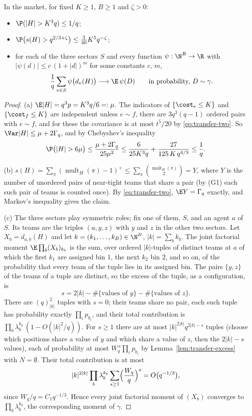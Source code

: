 \begin{proposition}[Typicality]\label{prop:transfer-typical}
In the market, for fixed $K\ge1$, $B\ge1$ and $\zeta>0$:
\begin{itemize}
\item[(a)] $\P(|H|>K^3q)\le1/q$;
\item[(b)] $\P\bigl(s(H)>q^{2/3+\zeta}\bigr)\le\tfrac{3}{40}K^5q^{-\zeta}$;
\item[(c)] for each of the three sectors $S$ and every function $\psi:\N^B\to\R$ with
$|\psi(d)|\le c\,(1+|d|)^m$ for some constants $c$, $m$,
\[
\frac1q\sum_{v\in S}\psi\bigl(d_v(H)\bigr)\longrightarrow\E\,\psi(D)\qquad\text{in probability, }D\sim\gamma .
\]
\end{itemize}
\end{proposition}

\begin{proof}
(a) $\E|H|=q^3p=K^3q/6=:\mu$. The indicators of $\{\cost_e\le K\}$ and $\{\cost_f\le K\}$ are
independent unless $e\sim f$, there are $3q^3(q-1)$ ordered pairs with $e\sim f$, and for these
the covariance is at most $t^5/20$ by \eqref{eq:transfer-two}. So
$\Var|H|\le\mu+2\Gamma_q$, and by Chebyshev's inequality
\[
\P\bigl(|H|>6\mu\bigr)\le\frac{\mu+2\Gamma_q}{25\mu^2}
\le\frac{6}{25K^3q}+\frac{27}{125\,K\,q^{4/3}}\le\frac1q .
\]

(b) $s(H)=\sum_\pi(\operatorname{mult}_H(\pi)-1)^+\le\sum_\pi\binom{\operatorname{mult}_H(\pi)}{2}=Y$,
where $Y$ is the number of unordered pairs of near-tight teams that share a pair (by (G1) each
such pair of teams is counted once). By \eqref{eq:transfer-two}, $\E Y=\Gamma_q$ exactly, and
Markov's inequality gives the claim.

(c) The three sectors play symmetric roles; fix one of them, $S$, and an agent $a$ of $S$.
Its teams are the triples $(a,y,z)$ with $y$ and $z$ in the other two sectors. Let $X_b=d_{a,b}(H)$ and let
$k=(k_1,\dots,k_B)\in\N^B$, $|k|=\sum_bk_b$. The joint factorial moment
$\E\prod_b(X_b)_{k_b}$ is the sum, over ordered $|k|$-tuples of distinct teams at $a$ of which
the first $k_1$ are assigned bin $1$, the next $k_2$ bin $2$, and so on, of the probability
that every team of the tuple lies in its assigned bin. The pairs $\{y,z\}$ of the teams of a
tuple are distinct, so the excess of the tuple, as a configuration, is
\[
s=2|k|-\#\{\text{values of }y\}-\#\{\text{values of }z\}.
\]
There are $(q)_{|k|}^2$ tuples with $s=0$; their teams share no pair, each such tuple has
probability exactly $\prod_ip_{b_i}$, and their total contribution is
$\prod_b\lambda_b^{k_b}\,(1-O(|k|^2/q))$. For $s\ge1$ there are at most
$|k|^{2|k|}q^{2|k|-s}$ tuples (choose which positions share a value of $y$ and which share a
value of $z$, then the $2|k|-s$ values), each of probability at most
$W_q^{\,s}\prod_ip_{b_i}$ by Lemma~\ref{lem:transfer-excess} with $N=\emptyset$. Their total
contribution is at most
\[
|k|^{2|k|}\prod_b\lambda_b^{k_b}\sum_{s\ge1}\Bigl(\frac{W_q}{q}\Bigr)^{s}=O\bigl(q^{-1/3}\bigr),
\]
since $W_q/q=C_1q^{-1/3}$. Hence every joint factorial moment of $(X_b)$ converges to
$\prod_b\lambda_b^{k_b}$, the corresponding moment of $\gamma$.


\end{proof}
